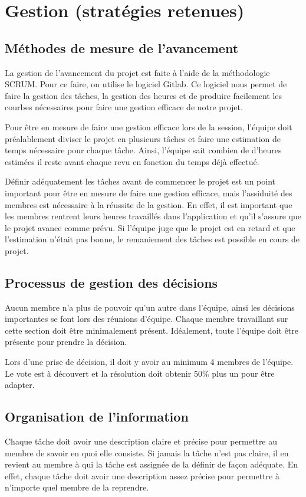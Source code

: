 \section{Gestion (stratégies retenues)}
	\subsection{Méthodes de mesure de l'avancement}
	La gestion de l’avancement du projet est faite à l’aide de la méthodologie SCRUM. Pour ce faire, on utilise le logiciel Gitlab. Ce logiciel nous permet de faire la gestion des tâches, la gestion des heures et de produire facilement les courbes nécessaires pour faire une gestion efficace de notre projet.
 
	Pour être en mesure de faire une gestion efficace lors de la session, l’équipe doit préalablement diviser le projet en plusieurs tâches et faire une estimation de temps nécessaire pour chaque tâche. Ainsi, l’équipe sait combien de d’heures estimées il reste avant chaque revu en fonction du temps déjà effectué.
 
	Définir adéquatement les tâches avant de commencer le projet est un point important pour être en mesure de faire une gestion efficace, mais l’assiduité des membres est nécessaire à la réussite de la gestion. En effet, il est important que les membres rentrent leurs heures travaillés dans l’application et qu’il s’assure que le projet avance comme prévu. Si l’équipe juge que le projet est en retard et que l’estimation n’était pas bonne, le remaniement des tâches est possible en cours de projet. 

	\subsection{Processus de gestion des décisions}
	Aucun membre n’a plus de pouvoir qu’un autre dans l’équipe, ainsi les décisions importantes se font lors des réunions d’équipe. Chaque membre travaillant sur cette section doit être minimalement présent. Idéalement, toute l’équipe doit être présente pour prendre la décision.
 
	Lors d’une prise de décision, il doit y avoir au minimum 4 membres de l’équipe. Le vote est à découvert et la résolution doit obtenir 50\% plus un pour être adapter.

	\subsection{Organisation de l'information}
	Chaque tâche doit avoir une description claire et précise pour permettre au membre de savoir en quoi elle consiste. Si jamais la tâche n’est pas claire, il en revient au membre à qui la tâche est assignée de la définir de façon adéquate. En effet, chaque tâche doit avoir une description assez précise pour permettre à n’importe quel membre de la reprendre.

